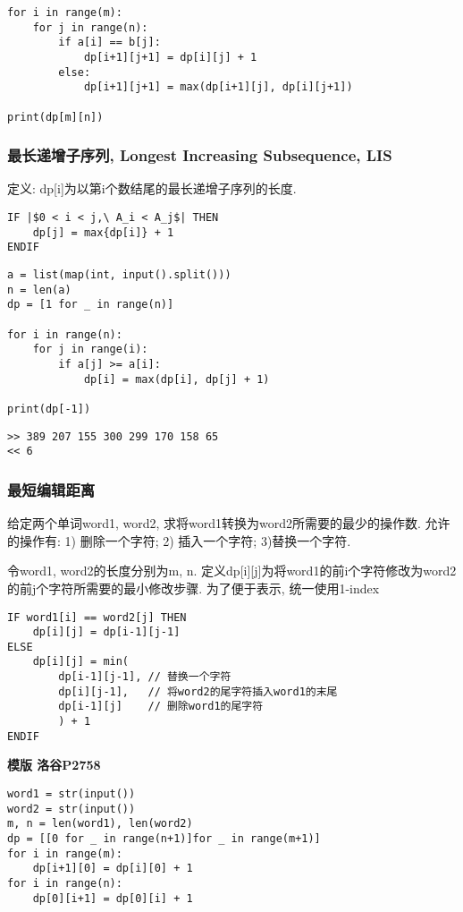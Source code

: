 \documentclass[../main]{subfiles}
\begin{document}
\begin{sloppy}
\begin{lstlisting}[style = Python]
for i in range(m):
    for j in range(n):
        if a[i] == b[j]:
            dp[i+1][j+1] = dp[i][j] + 1
        else:
            dp[i+1][j+1] = max(dp[i+1][j], dp[i][j+1])

print(dp[m][n])
\end{lstlisting}

\subsubsection{最长递增子序列, Longest Increasing Subsequence, LIS}

定义: dp[i]为以第i个数结尾的最长递增子序列的长度.

\begin{lstlisting}[style = Pseudocode, escapeinside=||]
IF |$0 < i < j,\ A_i < A_j$| THEN
    dp[j] = max{dp[i]} + 1
ENDIF 
\end{lstlisting}

\begin{lstlisting}[style = Python]
a = list(map(int, input().split()))
n = len(a)
dp = [1 for _ in range(n)]

for i in range(n):
    for j in range(i):
        if a[j] >= a[i]:
            dp[i] = max(dp[i], dp[j] + 1)

print(dp[-1])
\end{lstlisting}

\begin{verbatim}
>> 389 207 155 300 299 170 158 65
<< 6
\end{verbatim}

\newpage
\subsubsection{最短编辑距离}

给定两个单词word1, word2, 求将word1转换为word2所需要的最少的操作数. 允许的操作有: 1) 删除一个字符; 2) 插入一个字符; 3)替换一个字符.

令word1, word2的长度分别为m, n. 定义dp[i][j]为将word1的前i个字符修改为word2的前j个字符所需要的最小修改步骤. 为了便于表示, 统一使用1-index
\begin{lstlisting}[style = Pseudocode]
IF word1[i] == word2[j] THEN
    dp[i][j] = dp[i-1][j-1]
ELSE
    dp[i][j] = min(
        dp[i-1][j-1], // 替换一个字符
        dp[i][j-1],   // 将word2的尾字符插入word1的末尾
        dp[i-1][j]    // 删除word1的尾字符
        ) + 1
ENDIF
\end{lstlisting}

\textbf{模版  洛谷P2758}
\begin{lstlisting}[style = Python]
word1 = str(input())
word2 = str(input())
m, n = len(word1), len(word2)
dp = [[0 for _ in range(n+1)]for _ in range(m+1)]
for i in range(m):
    dp[i+1][0] = dp[i][0] + 1
for i in range(n):
    dp[0][i+1] = dp[0][i] + 1


\end{lstlisting}
\end{sloppy}
\end{document}
